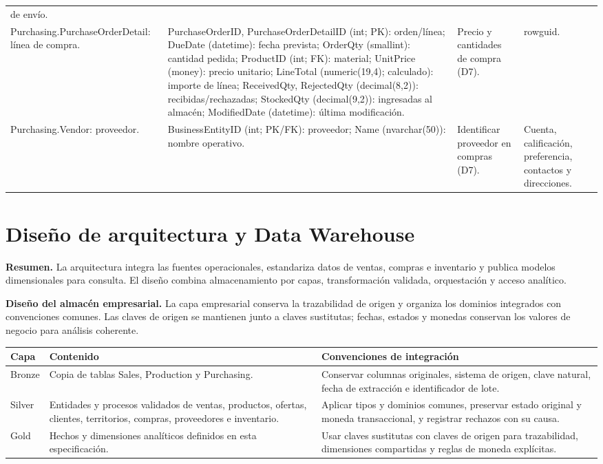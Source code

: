 \documentclass[10pt,a4paper]{article}
\begin{document}
\begin{longtable}{p{}p{}p{}p{}}
de envío.\\
Purchasing.\allowbreak PurchaseOrderDetail: línea de compra. &
PurchaseOrderID, PurchaseOrderDetailID (int; PK): orden/línea; DueDate
(datetime): fecha prevista; OrderQty (smallint): cantidad pedida; ProductID
(int; FK): material; UnitPrice (money): precio unitario; LineTotal
(numeric(19,4); calculado): importe de línea; ReceivedQty, RejectedQty
(decimal(8,2)): recibidas/rechazadas; StockedQty (decimal(9,2)): ingresadas
al almacén; ModifiedDate (datetime): última modificación. & Precio y
cantidades de compra (D7). & rowguid.\\
Purchasing.\allowbreak Vendor: proveedor. &
BusinessEntityID (int; PK/FK): proveedor; Name (nvarchar(50)): nombre
operativo. & Identificar proveedor en compras (D7). & Cuenta, calificación,
preferencia, contactos y direcciones.\\
\bottomrule
\end{longtable}
\normalsize

\section{Diseño de arquitectura y Data Warehouse}

\textbf{Resumen.} La arquitectura integra las fuentes operacionales,
estandariza datos de ventas, compras e inventario y publica modelos
dimensionales para consulta. El diseño combina almacenamiento por capas,
transformación validada, orquestación y acceso analítico.

\textbf{Diseño del almacén empresarial.} La capa empresarial conserva la
trazabilidad de origen y organiza los dominios integrados con convenciones
comunes. Las claves de origen se mantienen junto a claves sustitutas; fechas,
estados y monedas conservan los valores de negocio para análisis coherente.

\small
\begin{longtable}{p{}p{}p{}}
\toprule
\textbf{Capa} & \textbf{Contenido} & \textbf{Convenciones de integración}\\
\midrule
\endhead
Bronze & Copia de tablas Sales, Production y Purchasing. &
Conservar columnas originales, sistema de origen, clave natural, fecha de
extracción e identificador de lote.\\
Silver & Entidades y procesos validados de ventas, productos, ofertas,
clientes, territorios, compras, proveedores e inventario. &
Aplicar tipos y dominios comunes, preservar estado original y moneda
transaccional, y registrar rechazos con su causa.\\
Gold & Hechos y dimensiones analíticos definidos en esta especificación. &
Usar claves sustitutas con claves de origen para trazabilidad, dimensiones
compartidas y reglas de moneda explícitas.\\
\bottomrule
\end{longtable}
\normalsize
\end{document}
